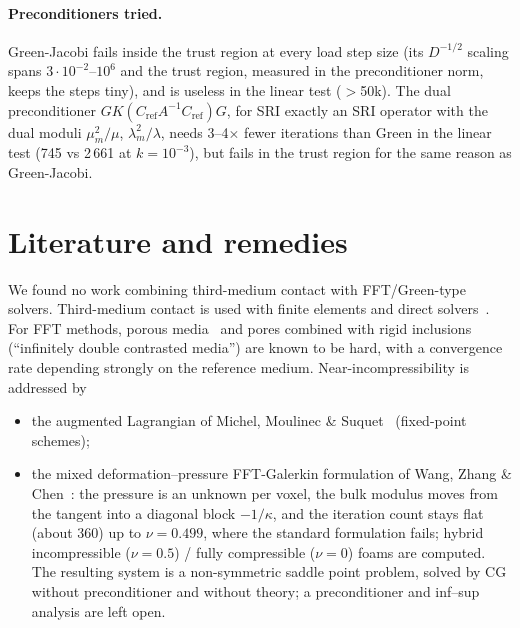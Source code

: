 \documentclass[11pt,a4paper]{article}
\begin{document}
\paragraph{Preconditioners tried.} Green-Jacobi fails inside the trust region at every load step size (its
$D^{-1/2}$ scaling spans $3\cdot10^{-2}$--$10^{6}$ and the trust region, measured in the preconditioner norm, keeps
the steps tiny), and is useless in the linear test ($>$50k). The dual preconditioner $G K(C_{\text{ref}}A^{-1}
C_{\text{ref}}) G$, for SRI exactly an SRI operator with the dual moduli $\mu_m^2/\mu$, $\lambda_m^2/\lambda$,
needs 3--4$\times$ fewer iterations than Green in the linear test (745 vs 2\,661 at $k = 10^{-3}$), but fails in the
trust region for the same reason as Green-Jacobi.

\section{Literature and remedies}

We found no work combining third-medium contact with FFT/Green-type solvers. Third-medium contact is used with
finite elements and direct solvers~\cite{Bluhm2021,Wriggers2025}. For FFT methods, porous media~\cite{Schneider2020}
and pores combined with rigid inclusions (``infinitely double contrasted media'') are known to be hard, with a
convergence rate depending strongly on the reference medium. Near-incompressibility is addressed by
\begin{itemize}
\item the augmented Lagrangian of Michel, Moulinec \& Suquet~\cite{Michel2000} (fixed-point schemes);
\item the mixed deformation--pressure FFT-Galerkin formulation of Wang, Zhang \& Chen~\cite{Wang2022}: the pressure
is an unknown per voxel, the bulk modulus moves from the tangent into a diagonal block $-1/\kappa$, and the iteration
count stays flat (about 360) up to $\nu = 0.499$, where the standard formulation fails; hybrid incompressible
($\nu = 0.5$) / fully compressible ($\nu = 0$) foams are computed. The resulting system is a non-symmetric saddle
point problem, solved by CG without preconditioner and without theory; a preconditioner and inf--sup analysis are
left open.
\end{itemize}
\end{document}
